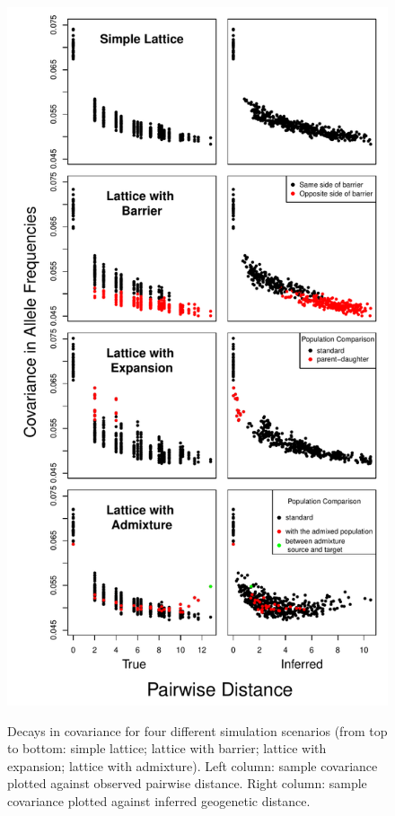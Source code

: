 \documentclass[10pt,letterpaper]{article}
\begin{document}
\begin{figure}
	\centering
		{\includegraphics[height=.8\textheight]{../figs/sims/sim_covariance_decays.pdf}}
		\caption{Decays in covariance for four different simulation scenarios (from top to bottom: simple lattice; lattice with barrier; lattice with expansion; lattice with admixture).  Left column: sample covariance plotted against observed pairwise distance.  Right column: sample covariance plotted against inferred geogenetic distance.}
	\label{sfig:sim_covariance_decays}
\end{figure}
\end{document}
